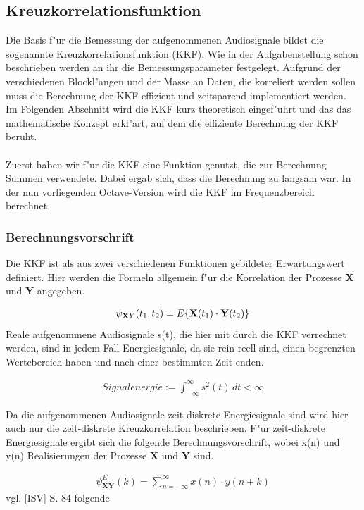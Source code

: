 \subsection{Kreuzkorrelationsfunktion}
Die Basis f"ur die Bemessung der aufgenommenen Audiosignale bildet die sogenannte Kreuzkorrelationsfunktion (KKF). Wie in der Aufgabenstellung schon beschrieben werden an ihr die Bemessungsparameter festgelegt. Aufgrund der verschiedenen Blockl"angen und der Masse an Daten, die korreliert werden sollen muss die Berechnung der KKF effizient und zeitsparend implementiert werden. Im Folgenden Abschnitt wird die KKF kurz theoretisch eingef"uhrt und das das mathematische Konzept erkl"art, auf dem die effiziente Berechnung der KKF beruht.
\\\\
Zuerst haben wir f"ur die KKF eine Funktion genutzt, die zur Berechnung Summen verwendete. Dabei ergab sich, dass die Berechnung zu langsam war. In der nun vorliegenden Octave-Version wird die KKF im Frequenzbereich berechnet.
\subsubsection{Berechnungsvorschrift}
Die KKF ist als aus zwei verschiedenen Funktionen gebildeter Erwartungswert definiert. Hier werden die Formeln allgemein f"ur die Korrelation der Prozesse \textbf{X} und \textbf{Y} angegeben. 

\begin{align}
\psi_{\textbf XY}(t_1, t_2) = E\lbrace\textbf{X}(t_1)\cdot\textbf{Y}(t_2)\rbrace
\end{align}
Reale aufgenommene Audiosignale s(t), die hier mit durch die KKF verrechnet werden, sind in jedem Fall Energiesignale, da sie rein reell sind, einen begrenzten Wertebereich haben und nach einer bestimmten Zeit enden.

\begin{align}
Signalenergie := \int_{-\infty}^{\infty} s^2(t) \,dt < \infty
\end{align}

\noindent Da die aufgenommenen Audiosignale zeit-diskrete Energiesignale sind wird hier auch nur die zeit-diskrete Kreuzkorrelation beschrieben. F"ur zeit-diskrete Energiesignale ergibt sich die folgende Berechnungsvorschrift, wobei x(n) und y(n) Realisierungen der Prozesse \textbf{X} und \textbf{Y} sind.

\begin{align}
\boxed{\psi_{\textbf {XY}}^E(k) = \sum_{n = -\infty}^{\infty} x(n) \cdot y(n+k)}
\end{align}
vgl. [ISV] S. 84 folgende


